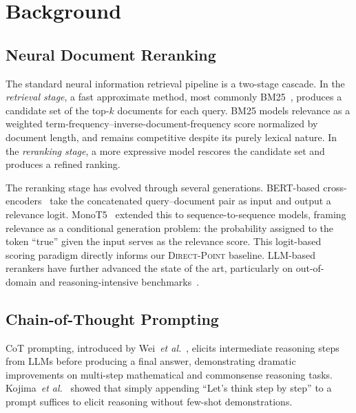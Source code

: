 \documentclass[12pt]{article}
\newcommand{\direct}{\textsc{Direct-Point}}
\newcommand{\CoT}{CoT}
\newcommand{\etal}{\textit{et al.}}
\begin{document}
\section{Background}
\label{sec:background}

\subsection{Neural Document Reranking}

The standard neural information retrieval pipeline is a two-stage cascade.
In the \emph{retrieval stage}, a fast approximate method, most commonly
BM25~\citep{robertson2009probabilistic}, produces a candidate set of the
top-$k$ documents for each query.  BM25 models relevance as a weighted
term-frequency--inverse-document-frequency score normalized by document
length, and remains competitive despite its purely lexical nature.  In the
\emph{reranking stage}, a more expressive model rescores the candidate set
and produces a refined ranking.

The reranking stage has evolved through several generations.  BERT-based
cross-encoders~\citep{nogueira2019passage} take the concatenated
query--document pair as input and output a relevance logit.
MonoT5~\citep{nogueira2020document} extended this to sequence-to-sequence
models, framing relevance as a conditional generation problem: the probability
assigned to the token ``true'' given the input serves as the relevance score.
This logit-based scoring paradigm directly informs our \direct{} baseline.
LLM-based rerankers have further advanced the state of the art, particularly
on out-of-domain and reasoning-intensive
benchmarks~\citep{sun2023chatgpt, pradeep2023rankvicuna, pradeep2023rankzephyr}.

\subsection{Chain-of-Thought Prompting}

\CoT{} prompting, introduced by Wei~\etal~\citep{wei2022chain}, elicits
intermediate reasoning steps from LLMs before producing a final answer,
demonstrating dramatic improvements on multi-step mathematical and commonsense
reasoning tasks.  Kojima~\etal~\citep{kojima2022large} showed that simply
appending ``Let's think step by step'' to a prompt suffices to elicit reasoning
without few-shot demonstrations.
\end{document}
